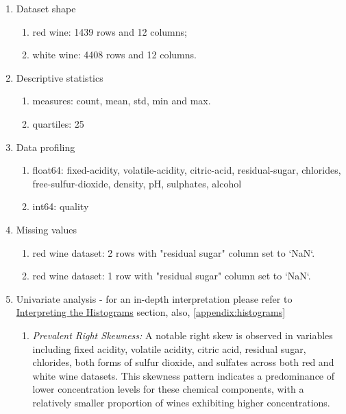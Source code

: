 \documentclass{article}
\begin{document}
\begin{enumerate}
    \item Dataset shape
        \begin{enumerate}
            \item red wine: 1439 rows and 12 columns;
            \item white wine: 4408 rows and 12 columns.
        \end{enumerate}
    \item Descriptive statistics
        \begin{enumerate}
            \item measures: count, mean, std, min and max.
            \item quartiles: 25%
        \end{enumerate}
    \item Data profiling
        \begin{enumerate}
            \item float64: fixed-acidity, volatile-acidity, citric-acid, residual-sugar, chlorides, free-sulfur-dioxide, density, pH, sulphates, alcohol
            \item int64: quality
        \end{enumerate}
    \item Missing values
        \begin{enumerate}
            \item red wine dataset: 2 rows with "residual sugar" column set to `NaN`.
            \item red wine dataset: 1 row with "residual sugar" column set to `NaN`.
        \end{enumerate}
    \item Univariate analysis - for an in-depth interpretation please refer to \href{https://github.com/hjoaquim/applied-ai/blob/main/wine-analysis/exploratory-analysis.ipynb}{Interpreting the Histograms} section, also, \ref{appendix:histograms}
        \begin{enumerate}
            \item \textit{Prevalent Right Skewness:} A notable right skew is observed in variables including fixed acidity, volatile acidity, citric acid, residual sugar, chlorides, both forms of sulfur dioxide, and sulfates across both red and white wine datasets. This skewness pattern indicates a predominance of lower concentration levels for these chemical components, with a relatively smaller proportion of wines exhibiting higher concentrations.


\end{enumerate}
\end{enumerate}
\end{document}
